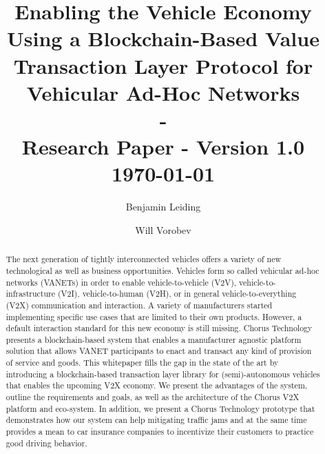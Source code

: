 \documentclass{llncs}
\begin{document}
	{
	\title{Enabling the Vehicle Economy Using a Blockchain-Based Value Transaction Layer Protocol for Vehicular Ad-Hoc Networks\\ - \\ \small Research Paper - Version 1.0\\\small \today}
	
	\author{Benjamin Leiding \and Will Vorobev}
	
	
	\maketitle


	\begin{abstract}


		The next generation of tightly interconnected vehicles offers a variety of new technological as well as  business opportunities. Vehicles form so called vehicular ad-hoc networks (VANETs) in order to enable vehicle-to-vehicle (V2V), vehicle-to-infrastructure (V2I), vehicle-to-human (V2H), or in general vehicle-to-everything (V2X) communication and interaction. A variety of manufacturers started implementing specific use cases that are limited to their own products. However, a default interaction standard for this new economy is still missing. Chorus Technology presents a blockchain-based system that enables a manufacturer agnostic platform solution that allows VANET participants to enact and transact any kind of provision of service and goods. This whitepaper fills the gap in the state of the art by introducing a blockchain-based transaction layer library for (semi)-autonomous vehicles that enables the upcoming V2X economy. We present the advantages of the system, outline the requirements and goals, as well as the architecture of the Chorus V2X platform and eco-system. In addition, we present a Chorus Technology prototype that demonstrates how our system can help mitigating traffic jams and at the same time provides a mean to car insurance companies to incentivize their customers to practice good driving behavior.
 



\end{abstract}}
\end{document}
